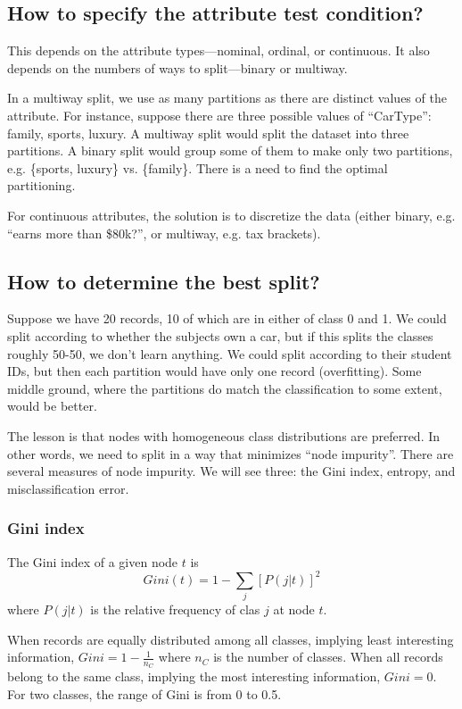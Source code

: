 \documentclass[a4paper,12pt]{article}
\begin{document}
\subsection{How to specify the attribute test condition?}

This depends on the attribute types---nominal, ordinal, or continuous. It also depends on the numbers of ways to split---binary or multiway. 

In a multiway split, we use as many partitions as there are distinct values of the attribute. For instance, suppose there are three possible values of ``CarType'': family, sports, luxury. A multiway split would split the dataset into three partitions. A binary split would group some of them to make only two partitions, e.g. \{sports, luxury\} vs. \{family\}. There is a need to find the optimal partitioning. 

For continuous attributes, the solution is to discretize the data (either binary, e.g. ``earns more than \$80k?'', or multiway, e.g. tax brackets). 

\subsection{How to determine the best split?}

Suppose we have 20 records, 10 of which are in either of class 0 and 1. We could split according to whether the subjects own a car, but if this splits the classes roughly 50-50, we don't learn anything. We could split according to their student IDs, but then each partition would have only one record (overfitting). Some middle ground, where the partitions do match the classification to some extent, would be better. 

The lesson is that nodes with homogeneous class distributions are preferred. In other words, we need to split in a way that minimizes ``node impurity''. There are several measures of node impurity. We will see three: the Gini index, entropy, and misclassification error. 

\subsubsection{Gini index}

The Gini index of a given node $t$ is 
$$Gini(t) = 1 - \sum_j [P(j|t)]^2$$
where $P(j|t)$ is the relative frequency of clas $j$ at node $t$. 

When records are equally distributed among all classes, implying least interesting information, $Gini = 1 - \frac{1}{n_C}$ where $n_C$ is the number of classes. When all records belong to the same class, implying the most interesting information, $Gini = 0$. For two classes, the range of Gini is from 0 to 0.5. 
\end{document}
